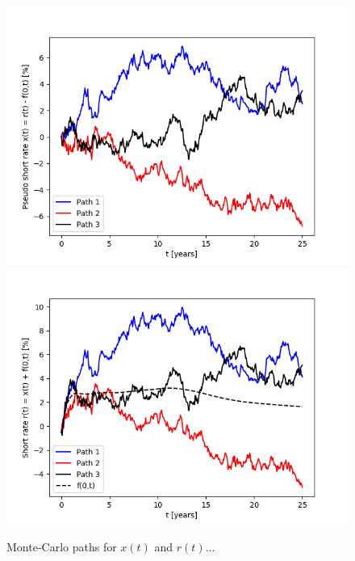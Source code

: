 \begin{figure}
\centering
\includegraphics[scale=0.7]{figures/pseudo_short_rate_paths.png}
\includegraphics[scale=0.7]{figures/short_rate_paths.png}
\caption{Monte-Carlo paths for $x(t)$ and $r(t)$...}
\end{figure}

